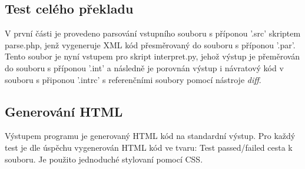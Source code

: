 \documentclass[a4paper, 10pt]{article}
\begin{document}
\subsection{Test celého překladu}
\qquad V první části je provedeno parsování vstupního souboru s příponou '.src' skriptem parse.php, jenž vygeneruje XML kód přesměrovaný do souboru s příponou '.par'. Tento soubor je nyní vstupem pro skript interpret.py, jehož výstup je přeměrován do souboru s příponou '.int' a následně je porovnán výstup i návratový kód v souboru s připonou '.intrc' s referenčními soubory pomocí nástroje \emph{diff}. 

\subsection{Generování HTML}
\qquad Výstupem programu je generovaný HTML kód na standardní výstup. Pro každý test je dle úspěchu vygenerován HTML kód ve tvaru: Test passed/failed cesta k souboru. Je použito jednoduché stylovaní pomocí CSS.
 
\end{document}
